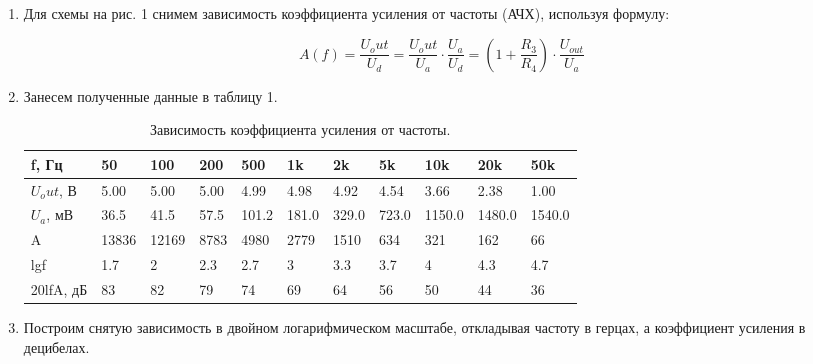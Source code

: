 \documentclass[a4paper]{article}
\begin{document}
\begin{enumerate}
    \item Для схемы на рис. 1 снимем зависимость коэффициента усиления от частоты (АЧХ), используя формулу:
    
    \begin{equation}
        A(f) = \frac{U_out}{U_d}=\frac{U_out}{U_a}\cdot\frac{U_a}{U_d} = (1+\frac{R_3}{R_4})\cdot \frac{U_{out}}{U_a}
     \end{equation}

    \item Занесем полученные данные в таблицу 1.
    
     \begin{table}[H]
        \centering
        \begin{center}
        \end{center}
        \vspace{0.1cm}
        \label{tab:my_label}
        \begin{tabular}{|p{2cm}|p{1cm}|p{1cm}|p{1cm}|p{1cm}|p{1cm}|p{1cm}|p{1cm}|p{1cm}|p{1cm}|p{1cm}|}
            \hline
            f, Гц & 50    & 100   & 200 & 500 & 1k    & 2k    & 5k    & 10k    & 20k    & 50k    \\ 
            \hline
            $U_out$, В  & 5.00  & 5.00  & 5.00 & 4.99  & 4.98  & 4.92  & 4.54  & 3.66   & 2.38   & 1.00   \\
            \hline
            $U_a$, мВ                    & 36.5  & 41.5  & 57.5  & 101.2 & 181.0 & 329.0 & 723.0 & 1150.0 & 1480.0 & 1540.0 \\
            \hline
            A                        & 13836 & 12169 & 8783                     & 4980                     & 2779  & 1510  & 634   & 321    & 162    & 66     \\
            \hline
            lgf                         & 1.7   & 2     & 2.3                      & 2.7                      & 3     & 3.3   & 3.7   & 4      & 4.3    & 4.7    \\
            \hline
            20lfA, дБ                   & 83    & 82    & 79                       & 74                       & 69    & 64    & 56    & 50     & 44     & 36   \\
            \hline 
            \end{tabular}
            \caption{Зависимость коэффициента усиления от частоты.}
    \end{table}
    \item  Построим снятую зависимость в двойном логарифмическом масштабе, откладывая частоту в герцах, а коэффициент усиления в децибелах.
    

\end{enumerate}
\end{document}
